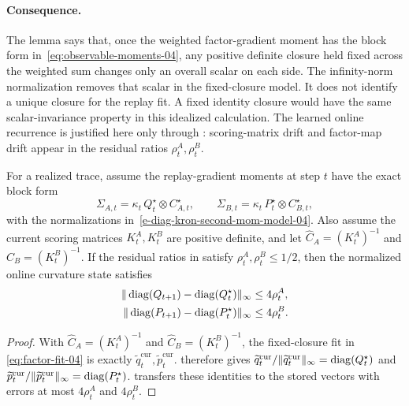 \paragraph{Consequence.}
The lemma says that, once the weighted factor-gradient moment has the block form
in~\eqref{eq:observable-moments-04}, any positive definite closure held fixed
across the weighted sum changes only an overall scalar on each side. The
infinity-norm normalization removes that scalar in the fixed-closure model. It
does not identify a unique closure for the replay fit. A fixed identity closure
would have the same scalar-invariance property in this idealized calculation.
The learned online recurrence is justified here only through
: scoring-matrix drift and factor-map drift appear in
the residual ratios $\rho^A_t,\rho^B_t$.

\begin{proposition}\label{prop:online-recovery-04}
For a realized trace, assume the replay-gradient moments at step $t$ have the
exact block form
\[
  \Sigma_{A,t}
  =
  \kappa_t\,Q^\star_t\otimes C^\star_{A,t},
  \qquad
  \Sigma_{B,t}
  =
  \kappa_t\,P^\star_t\otimes C^\star_{B,t},
\]
with the normalizations in~\eqref{e-diag-kron-second-mom-model-04}. Also assume
the current scoring matrices $K^A_t,K^B_t$ are positive definite, and let
$\widehat C_A=(K^A_t)^{-1}$ and $\widehat C_B=(K^B_t)^{-1}$. If the residual
ratios in  satisfy $\rho^A_t,\rho^B_t\le1/2$, then
the normalized online curvature state satisfies
\[
\begin{aligned}
  \| \operatorname{diag}(Q_{t+1})-\operatorname{diag}(Q^\star_t)\|_\infty
  &\le 4\rho^A_t,
  \\
  \| \operatorname{diag}(P_{t+1})-\operatorname{diag}(P^\star_t)\|_\infty
  &\le 4\rho^B_t .
\end{aligned}
\]
\end{proposition}
\begin{proof}
With $\widehat C_A=(K^A_t)^{-1}$ and
$\widehat C_B=(K^B_t)^{-1}$, the fixed-closure fit in
\eqref{eq:factor-fit-04} is exactly
$\widetilde q^{\mathrm{cur}}_t,\widetilde p^{\mathrm{cur}}_t$.
therefore gives
$\widetilde q^{\mathrm{cur}}_t/
 \| \widetilde q^{\mathrm{cur}}_t\|_\infty=\operatorname{diag}(Q^\star_t)$ and
$\widetilde p^{\mathrm{cur}}_t/
 \| \widetilde p^{\mathrm{cur}}_t\|_\infty=\operatorname{diag}(P^\star_t)$.
 transfers these identities to the stored vectors
with errors at most $4\rho^A_t$ and $4\rho^B_t$.
\end{proof}

